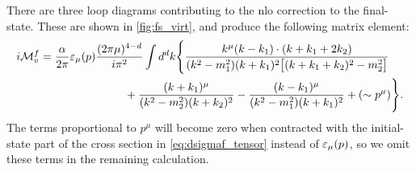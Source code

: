 There are three loop diagrams contributing to the \gls{nlo} correction to the final-state.
These are shown in \cref{fig:fs_virt}, and produce the following matrix element:
\begin{equation}
\begin{split}
    i\mathcal{M}^f_v &=
    \frac{\alpha}{2\pi} \varepsilon_\mu(p) \frac{(2\pi\mu)^{4-d}}{i\pi^2}
    \int d^dk \Biggl\{
        \frac{k^\mu(k-k_1)\cdot(k+k_1+2k_2)}{(k^2-m_1^2)(k+k_1)^2\bigl[ (k+k_1+k_2)^2-m_2^2 \bigr]}
        \\ &\hspace{7.5em}
        +\frac{(k+k_1)^\mu}{(k^2-m_2^2)(k+k_2)^2}
        - \frac{(k-k_1)^\mu}{(k^2-m_1^2)(k+k_1)^2}
        + (\sim p^\mu)
    \Biggr\}.
\end{split}
\label{eq:Mf_virt}
\end{equation}
The terms proportional to $p^\mu$ will become zero when contracted with the initial-state part of the cross section in \cref{eq:dsigmaf_tensor} instead of $\varepsilon_\mu(p)$, so we omit these terms in the remaining calculation.

